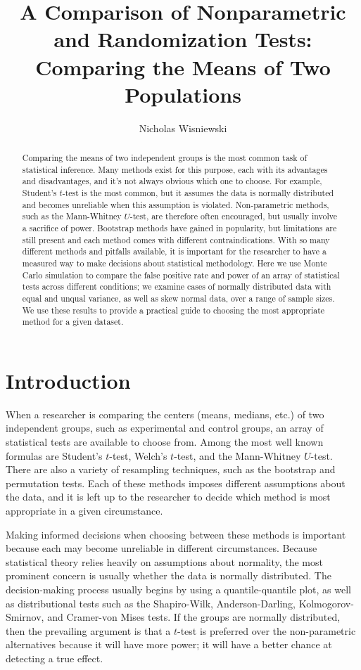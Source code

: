 \documentclass[10pt]{article} %
\title{A Comparison of Nonparametric and Randomization Tests:  \\
	\large Comparing the Means of Two Populations}
\author{Nicholas Wisniewski}
\affil{Department of Medicine (Cardiology)\\ Department of Integrative Biology and Physiology \\University of California, Los Angeles}
\begin{document}
\maketitle
\begin{abstract}
        \noindent Comparing the means of two independent groups is the most common task of statistical inference. Many methods exist for this purpose, each with its advantages and disadvantages, and it's not always obvious which one to choose. For example, Student's $t$-test is the most common, but it assumes the data is normally distributed and becomes unreliable when this assumption is violated. Non-parametric methods, such as the Mann-Whitney $U$-test, are therefore often encouraged, but usually involve a sacrifice of power. Bootstrap methods have gained in popularity, but limitations are still present and each method comes with different contraindications. With so many different methods and pitfalls available, it is important for the researcher to have a measured way to make decisions about statistical methodology. Here we use Monte Carlo simulation to compare the false positive rate and power of an array of statistical tests across different conditions; we examine cases of normally distributed data with equal and unqual variance, as well as skew normal data, over a range of sample sizes. We use these results to provide a practical guide to choosing the most appropriate method for a given dataset. 
    \end{abstract}
\section{Introduction}

When a researcher is comparing the centers (means, medians, etc.) of two independent groups, such as experimental and control groups, an array of statistical tests are available to choose from. Among the most well known formulas are Student's $t$-test, Welch's $t$-test, and the Mann-Whitney $U$-test. There are also a variety of resampling techniques, such as the bootstrap and permutation tests. Each of these methods imposes different assumptions about the data, and it is left up to the researcher to decide which method is most appropriate in a given circumstance. 

Making informed decisions when choosing between these methods is important because each may become unreliable in different circumstances. Because statistical theory relies heavily on assumptions about normality, the most prominent concern is usually whether the data is normally distributed. The decision-making process usually begins by using a quantile-quantile plot, as well as distributional tests such as the Shapiro-Wilk, Anderson-Darling, Kolmogorov-Smirnov, and Cramer-von Mises tests. If the groups are normally distributed, then the prevailing argument is that a $t$-test is preferred over the non-parametric alternatives because it will have more power; it will have a better chance at detecting a true effect. 
\end{document}
